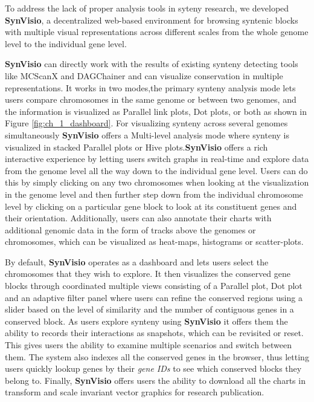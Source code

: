 To address the lack of proper analysis tools in syteny research, we developed \textbf{SynVisio}, a decentralized web-based environment for browsing syntenic blocks with multiple visual representations across different scales from the whole genome level to the individual gene level.

\textbf{SynVisio} can directly work with the results of existing synteny detecting tools like MCScanX\cite{wang2012mcscanx} and DAGChainer\cite{haas2004dagchainer} and can visualize conservation in multiple representations. It works in two modes,the primary synteny analysis mode lets users compare chromosomes in the same genome or between two genomes, and the information is visualized as Parallel link plots, Dot plots, or both as shown in Figure \ref{fig:ch_1_dashboard}. For visualizing synteny across several genomes simultaneously \textbf{SynVisio} offers a Multi-level analysis mode where synteny is visualized in stacked Parallel plots or Hive plots.\textbf{SynVisio} offers a rich interactive experience by letting users switch graphs in real-time and explore data from the genome level all the way down to the individual gene level. Users can do this by simply clicking on any two chromosomes when looking at the visualization in the genome level and then further step down from the individual chromosome level by clicking on a particular gene block to look at its constituent genes and their orientation. Additionally, users can also annotate their charts with additional genomic data in the form of tracks above the genomes or chromosomes, which can be visualized as heat-maps, histograms or scatter-plots.



By default, \textbf{SynVisio} operates as a dashboard and lets users select the chromosomes that they wish to explore. It then visualizes the conserved gene blocks through coordinated multiple views consisting of a Parallel plot, Dot plot and an adaptive filter panel where users can refine the conserved regions using a slider based on the level of similarity and the number of contiguous genes in a conserved block.
As users explore synteny using \textbf{SynVisio} it offers them the ability to records their interactions as snapshots, which can be revisited or reset. This gives users the ability to examine multiple scenarios and switch between them. The system also indexes all the conserved genes in the browser, thus letting users quickly lookup genes by their \textit{gene IDs} to see which conserved blocks they belong to. Finally, \textbf{SynVisio} offers users the ability to download all the charts in transform and scale invariant vector graphics for research publication.

